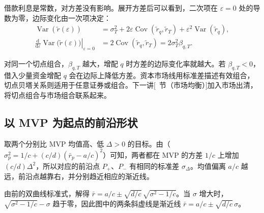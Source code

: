 借款利息是常数，对方差没有影响。展开方差后可以看到，二次项在 $\varepsilon=0$ 处的导数为零，边际变化由一次项决定：
\[
 \begin{aligned}
 \operatorname{Var}(\widetilde r(\varepsilon))
 &=\sigma_T^2+2\varepsilon\operatorname{Cov}(\widetilde r_q,\widetilde r_T)
   +\varepsilon^2\operatorname{Var}(\widetilde r_q),\\
 \left.\frac{\mathrm d}{\mathrm d\varepsilon}
 \operatorname{Var}\bigl(\widetilde r(\varepsilon)\bigr)\right|_{\varepsilon=0}
 &=2\operatorname{Cov}(\widetilde r_q,\widetilde r_T)
 =2\sigma_T^2\beta_{q,T}.
 \end{aligned}
\]

对同一个切点组合，$\beta_{q,T}$ 越大，增配 $q$ 时方差的边际变化率就越大。若 $\beta_{q,T}<0$，借入少量资金增配 $q$ 会在边际上降低方差。资本市场线用标准差描述有效组合，切点贝塔关系则适用于任意证券或组合。下一讲[~节（市场均衡）]加入市场出清，将切点组合与市场组合联系起来。

\subsection*{以 MVP 为起点的前沿形状}

 取两个分别比 MVP 均值高、低 $\Delta>0$ 的目标。由（$\sigma_p^2=1/c+(c/d)(\bar r_p-a/c)^2$）可知，两者都在 MVP 的方差 $1/c$ 上增加 $(c/d)\Delta^2$，所以对应的前沿点 $P_+$、$P_-$ 有相同的标准差 $\sigma_\Delta$。均值偏离 $a/c$ 越远，前沿点越靠右，并分别趋近相应的渐近线。

\begin{center}
\begin{minipage}{\linewidth}
\centering
\renewcommand{\thewjFigure}{\thechapter.S\arabic{wjFigure}}%
%
\par
{}
\end{minipage}
\end{center}

由前的双曲线标准式，解得 $\bar r=a/c\pm\sqrt{d/c}\,\sqrt{\sigma^2-1/c}$。当 $\sigma$ 增大时，$\sqrt{\sigma^2-1/c}-\sigma$ 趋于零，因此图中的两条斜虚线是渐近线 $\bar r=a/c\pm\sqrt{d/c}\,\sigma$。

